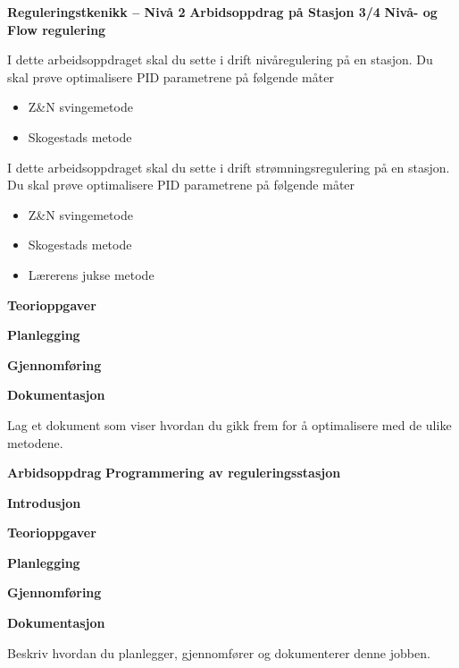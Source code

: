 


\begin{center}
\vskip 5pt 
\textbf{Reguleringstkenikk -- Nivå 2 }
\vskip 5pt 
\textbf{Arbidsoppdrag på Stasjon 3/4}
\vskip 5pt 
\textbf{Nivå- og Flow regulering}
\end{center}


I dette arbeidsoppdraget skal du sette i drift nivåregulering på en stasjon. Du skal prøve optimalisere PID parametrene på følgende måter\begin{itemize}[noitemsep]
\item Z\&N svingemetode
\item Skogestads metode
\end{itemize}
I dette arbeidsoppdraget skal du sette i drift strømningsregulering på en stasjon. Du skal prøve optimalisere PID parametrene på følgende måter\begin{itemize}[noitemsep]
\item Z\&N svingemetode
\item Skogestads metode
\item Lærerens jukse metode
\end{itemize}



\textbf{Teorioppgaver}

\textbf{Planlegging}

\textbf{Gjennomføring}

\textbf{Dokumentasjon}

Lag et dokument som viser hvordan du gikk frem for å optimalisere med de ulike metodene. 

\vskip 5pt
\begin{center}
\textbf{Arbidsoppdrag}
\vskip 5pt 
\textbf{Programmering av reguleringsstasjon}
\end{center}

\vskip 10pt 
\textbf{Introdusjon}

\vskip 5pt 

\vskip 5pt 


\vskip 10pt 
\textbf{Teorioppgaver}

\vskip 5pt 

\vskip 10pt 
\textbf{Planlegging}


\vskip 10pt 
\textbf{Gjennomføring}

\vskip 10pt 
\textbf{Dokumentasjon}

Beskriv hvordan du planlegger, gjennomfører og dokumenterer denne jobben. 


















